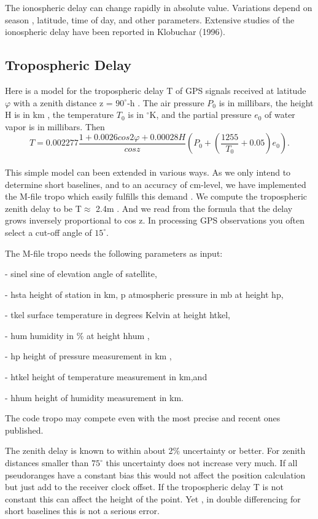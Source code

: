 The ionospheric delay can change rapidly in absolute value. Variations depend on season , latitude, time of day, and other parameters. Extensive studies of the ionospheric delay have been reported in Klobuchar (1996).

\subsection{Tropospheric Delay}

Here is a model for the tropospheric delay T of GPS signals received at latitude $\varphi$ with a zenith distance z = $90^{\circ}$-h . The air pressure $P_{0}$ is in millibars, the height H is in km , the temperature $T_{0}$ is in $^{\circ}$K, and the partial pressure $e_{0}$ of water vapor is in millibars. Then
\begin{equation}
T=0.002277\frac{1+0.0026cos2\varphi+0.00028H}{cosz}(P_{0}+(\frac{1255}{T_{0}}+0.05)e_{0}).
\end{equation}\\
This simple model can been extended in various ways. As we only intend to determine
short baselines, and to an accuracy of cm-level, we have implemented the M-file tropo
which easily fulfills this demand . We compute the tropospheric zenith delay to be T$\approx$
2.4m . And we read from the formula that the delay grows inversely proportional to
cos z. In processing GPS observations you often select a cut-off angle of $15^{\circ}$.

The M-file tropo needs the following parameters as input:

- sinel  sine of elevation angle of satellite,

- hsta  height of station in km, p atmospheric pressure in mb at height hp,

- tkel  surface temperature in degrees Kelvin at height htkel,

- hum  humidity in \% at height hhum ,

- hp  height of pressure measurement in km ,

- htkel  height of temperature measurement in km,and

- hhum  height of humidity measurement in km.

The code tropo may compete even with the most precise and recent ones published.


The zenith delay is known to within about 2\% uncertainty or better. For zenith distances
smaller than  $75^{\circ}$ this uncertainty does not increase very much. If all pseudoranges have a constant bias this would not affect the position calculation but just add to the receiver clock offset. If the tropospheric delay T is not constant this can affect the height of the point. Yet , in double differencing for short baselines this is not a serious error.

